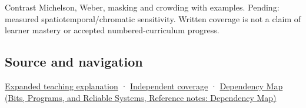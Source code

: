 Contrast Michelson, Weber, masking and crowding with examples. Pending: measured spatiotemporal/chromatic sensitivity. Written coverage is not a claim of learner mastery or accepted numbered-curriculum progress.

\subsection{Source and navigation}\label{appendix-b3aa9e8e01ad-source-and-navigation}

\hyperref[04-visual-computing-ii-ch042-visibility-is-about-contrast-conditions-and-tasks]{Expanded teaching explanation} · \hyperref[appendix-fd090d982a15-xr01---independent-seeing-and-representation-source]{Independent coverage} · \href{../01-Bits-Programs-and-Reliable-Systems/main.pdf\#nameddest=appendix-4ad47bdd269a}{Dependency Map (Bits, Programs, and Reliable Systems, Reference notes: Dependency Map)}
